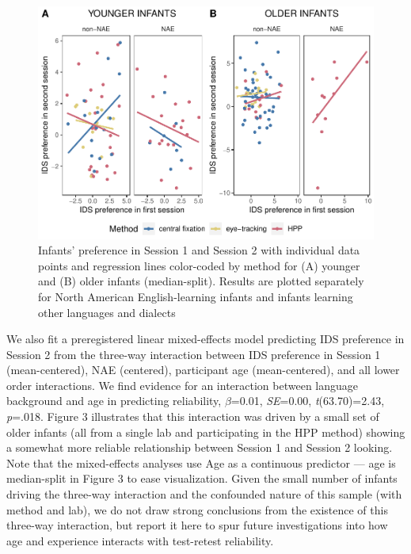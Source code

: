\documentclass[
  man, donotrepeattitle,floatsintext]{apa6}
\begin{document}
\begin{figure}
\centering
\includegraphics{MB1T_supplement_files/figure-latex/unnamed-chunk-17-1.pdf}
\caption{\label{fig:unnamed-chunk-17}Infants' preference in Session 1 and Session 2 with individual data points and regression lines color-coded by method for (A) younger and (B) older infants (median-split). Results are plotted separately for North American English-learning infants and infants learning other languages and dialects}
\end{figure}

We also fit a preregistered linear mixed-effects model predicting IDS preference in Session 2 from the three-way interaction between IDS preference in Session 1 (mean-centered), NAE (centered), participant age (mean-centered), and all lower order interactions.
We find evidence for an interaction between language background and age in predicting reliability, \(\beta\)=0.01, \emph{SE}=0.00, \emph{t}(63.70)=2.43, \emph{p}=.018.
Figure 3 illustrates that this interaction was driven by a small set of older infants (all from a single lab and participating in the HPP method) showing a somewhat more reliable relationship between Session 1 and Session 2 looking.
Note that the mixed-effects analyses use Age as a continuous predictor --- age is median-split in Figure 3 to ease visualization.
Given the small number of infants driving the three-way interaction and the confounded nature of this sample (with method and lab), we do not draw strong conclusions from the existence of this three-way interaction, but report it here to spur future investigations into how age and experience interacts with test-retest reliability.
\end{document}
